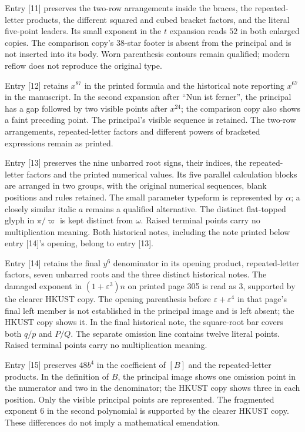 Entry [11] preserves the two-row arrangements inside the braces, the repeated-letter products, the different squared and cubed bracket factors, and the literal five-point leaders. Its small exponent in the $t$ expansion reads $52$ in both enlarged copies. The comparison copy’s 38-star footer is absent from the principal and is not inserted into its body. Worn parenthesis contours remain qualified; modern reflow does not reproduce the original type.

Entry [12] retains $x^{87}$ in the printed formula and the historical note reporting $x^{67}$ in the manuscript. In the second expansion after “Nun ist ferner”, the principal has a gap followed by two visible points after $x^{24}$; the comparison copy also shows a faint preceding point. The principal’s visible sequence is retained. The two-row arrangements, repeated-letter factors and different powers of bracketed expressions remain as printed.

Entry [13] preserves the nine unbarred root signs, their indices, the repeated-letter factors and the printed numerical values. Its five parallel calculation blocks are arranged in two groups, with the original numerical sequences, blank positions and rules retained. The small parameter typeform is represented by $\alpha$; a closely similar italic $a$ remains a qualified alternative. The distinct flat-topped glyph in $\pi/\varpi$ is kept distinct from $\omega$. Raised terminal points carry no multiplication meaning. Both historical notes, including the note printed below entry [14]’s opening, belong to entry [13].

Entry [14] retains the final $y^6$ denominator in its opening product, repeated-letter factors, seven unbarred roots and the three distinct historical notes. The damaged exponent in $(1+\varepsilon^3)n$ on printed page 305 is read as $3$, supported by the clearer HKUST copy. The opening parenthesis before $\varepsilon+\varepsilon^4$ in that page’s final left member is not established in the principal image and is left absent; the HKUST copy shows it. In the final historical note, the square-root bar covers both $q/p$ and $P/Q$. The separate omission line contains twelve literal points. Raised terminal points carry no multiplication meaning.

Entry [15] preserves $48b^4$ in the coefficient of $[B]$ and the repeated-letter products. In the definition of $B$, the principal image shows one omission point in the numerator and two in the denominator; the HKUST copy shows three in each position. Only the visible principal points are represented. The fragmented exponent $6$ in the second polynomial is supported by the clearer HKUST copy. These differences do not imply a mathematical emendation.

